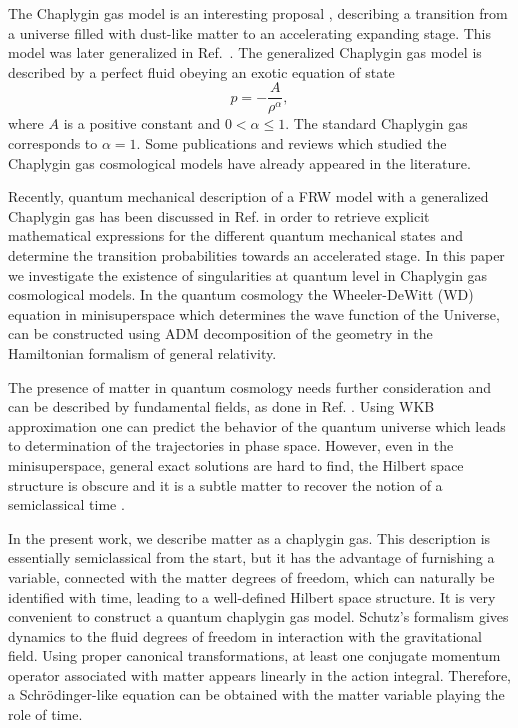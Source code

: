 The Chaplygin gas model is an interesting proposal \cite{Kamenshchik}, describing a transition from a universe filled with dust-like matter to an
accelerating expanding stage. This model was later generalized in Ref.~\cite{Bilic,A}. The generalized Chaplygin gas model is described by a perfect
fluid obeying an exotic equation of state \cite{A}
\begin{equation}
p=-\frac{A}{\rho ^{\alpha }},  \label{cgi1}
\end{equation}
where $A$ is a positive constant and $0<\alpha \leq 1$. The standard
Chaplygin gas \cite{Kamenshchik} corresponds to $\alpha =1$. Some
publications
\cite{Bento,3rp,2rp,Fabris,C,Ogawa,NewBD,18a,20a,21a,23a,27a,Rev1,Rev2,DySy,Jackiw,setare1,setare2,setare3}
and reviews \cite{Rev1,Rev2} which studied the Chaplygin gas
cosmological models have already appeared in the literature.

Recently, quantum mechanical description of a FRW model with a generalized Chaplygin gas has been discussed in Ref. \cite{Buahmadi} in order to
retrieve explicit mathematical expressions for the different quantum mechanical states and determine the transition probabilities towards an
accelerated stage. In this paper we investigate the existence of singularities at quantum level in Chaplygin gas cosmological models. In the quantum
cosmology the Wheeler-DeWitt (WD) equation in minisuperspace which determines the wave function of the Universe, can be constructed using ADM
decomposition of the geometry \cite{7} in the Hamiltonian formalism of general relativity.

The presence of matter in quantum cosmology needs further consideration and can be described by
fundamental fields, as done in Ref. \cite{10}. Using WKB approximation one can predict the behavior
of the quantum universe which leads to determination of the trajectories in phase space. However,
even in the minisuperspace, general exact solutions are hard to find, the Hilbert space structure
is obscure and it is a subtle matter to recover the notion of a semiclassical time \cite{8,10}.

In the present work, we describe matter as a chaplygin gas. This description is essentially
semiclassical from the start, but it has the advantage of furnishing a variable, connected with the
matter degrees of freedom, which can naturally be identified with time, leading to a well-defined
Hilbert space structure. It is very convenient to construct a quantum chaplygin gas model. Schutz's
formalism \cite{11,12} gives dynamics to the fluid degrees of freedom in interaction with the
gravitational field. Using proper canonical transformations, at least one conjugate momentum
operator associated with matter appears linearly in the action integral. Therefore, a
Schr\"odinger-like equation can be obtained with the matter variable playing the role of time.


